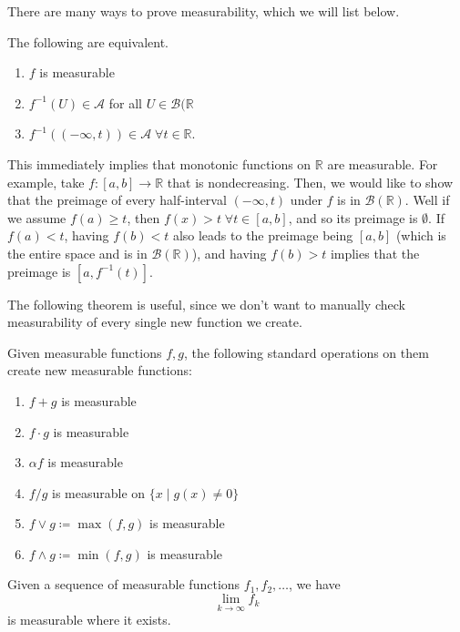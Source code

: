 \documentclass{article}
\begin{document}
There are many ways to prove measurability, which we will list below. 

\begin{theorem}[TFAE]
  The following are equivalent. 
  \begin{enumerate}
    \item $f$ is measurable 
    \item $f^{-1} (U) \in \mathcal{A}$ for all $U \in \mathcal{B}(\mathbb{R}$ 
    \item $f^{-1}((-\infty, t)) \in \mathcal{A} \; \forall t \in \mathbb{R}$. 
  \end{enumerate}
\end{theorem}

This immediately implies that monotonic functions on $\mathbb{R}$ are measurable. For example, take $f: [a, b] \longrightarrow \mathbb{R}$ that is nondecreasing. Then, we would like to show that the preimage of every half-interval $(-\infty, t)$ under $f$ is in $\mathcal{B}(\mathbb{R})$. Well if we assume $f(a) \geq t$, then $f(x) > t \; \forall t \in [a, b]$, and so its preimage is $\emptyset$. If $f(a) < t$, having $f(b) < t$ also leads to the preimage being $[a, b]$ (which is the entire space and is in $\mathcal{B}(\mathbb{R})$), and having $f(b) > t$ implies that the preimage is $[a, f^{-1}(t)]$. 

The following theorem is useful, since we don't want to manually check measurability of every single new function we create. 

\begin{theorem}
  Given measurable functions $f, g$, the following standard operations on them create new measurable functions: 
  \begin{enumerate}
    \item $f + g$ is measurable 
    \item $f \cdot g$ is measurable 
    \item $\alpha f$ is measurable 
    \item $f / g$ is measurable on $\{x \mid g(x) \neq 0\}$ 
    \item $f \vee g \coloneqq \max (f, g)$ is measurable 
    \item $f \wedge g \coloneqq \min (f, g)$ is measurable 
  \end{enumerate}
\end{theorem}

\begin{theorem}
  Given a sequence of measurable functions $f_1, f_2, \ldots$, we have 
  \[\lim_{k \rightarrow \infty} f_k\]
  is measurable where it exists. 
\end{theorem}
\end{document}
